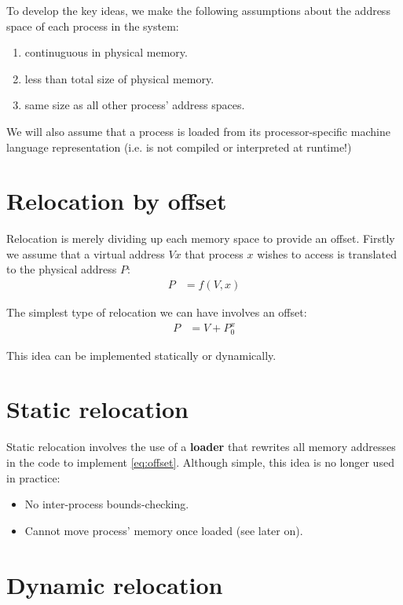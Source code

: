 To develop the key ideas, we make the following assumptions about the address space of each process in the system:

\begin{enumerate}
\item continuguous in physical memory.
\item less than total size of physical memory.
\item same size as all other process' address spaces.
\end{enumerate}

We will also assume that a process is loaded from its processor-specific machine language representation (i.e. is not compiled or interpreted at runtime!)

\section{Relocation by offset}

Relocation is merely dividing up each memory space to provide an offset.
Firstly we assume that a virtual address $Vx$ that process $x$ wishes to access is translated to the physical address $P$:
\begin{align}
  P & = f( V, x )
\end{align}

The simplest type of relocation we can have involves an offset:
\begin{align}
  P & = V + P_0^x \label{eq:offset}
\end{align}

This idea can be implemented statically or dynamically.

\section{Static relocation}

Static relocation involves the use of a \textbf{loader} that rewrites all memory addresses in the code to implement \autoref{eq:offset}.
Although simple, this idea is no longer used in practice: 

\begin{itemize} 
\item No inter-process bounds-checking.
\item Cannot move process' memory once loaded (see later on).
\end{itemize}

\section{Dynamic relocation}

